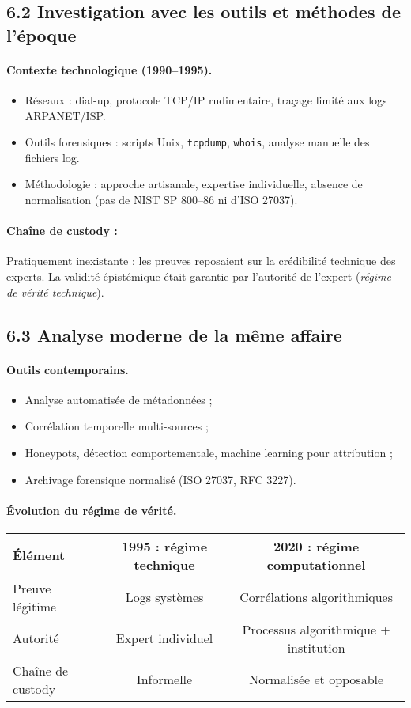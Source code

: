 \documentclass[12pt,a4paper]{article}
\begin{document}
\subsection{6.2 Investigation avec les outils et méthodes de l’époque}
\paragraph{Contexte technologique (1990–1995).}
\begin{itemize}
  \item Réseaux : dial-up, protocole TCP/IP rudimentaire, traçage limité aux logs ARPANET/ISP.
  \item Outils forensiques : scripts Unix, \texttt{tcpdump}, \texttt{whois}, analyse manuelle des fichiers log.
  \item Méthodologie : approche artisanale, expertise individuelle, absence de normalisation (pas de NIST SP 800–86 ni d’ISO 27037).
\end{itemize}

\paragraph{Chaîne de custody :}
Pratiquement inexistante ; les preuves reposaient sur la crédibilité technique des experts.  
La validité épistémique était garantie par l’autorité de l’expert (\emph{régime de vérité technique}).

\subsection{6.3 Analyse moderne de la même affaire}
\paragraph{Outils contemporains.}
\begin{itemize}
  \item Analyse automatisée de métadonnées ;
  \item Corrélation temporelle multi-sources ;
  \item Honeypots, détection comportementale, machine learning pour attribution ;
  \item Archivage forensique normalisé (ISO 27037, RFC 3227).
\end{itemize}

\paragraph{Évolution du régime de vérité.}
\begin{center}
\begin{tabular}{l c c}
\toprule
Élément & 1995 : régime technique & 2020 : régime computationnel \\
\midrule
Preuve légitime & Logs systèmes & Corrélations algorithmiques \\
Autorité & Expert individuel & Processus algorithmique + institution \\
Chaîne de custody & Informelle & Normalisée et opposable \\
\bottomrule
\end{tabular}
\end{center}
\end{document}
